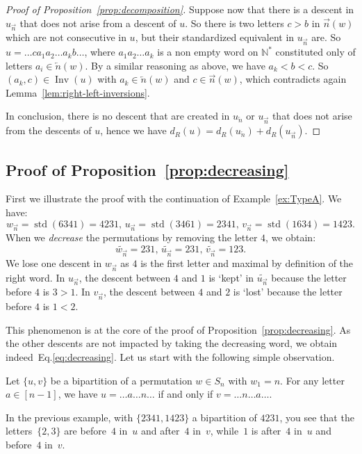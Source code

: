 \documentclass[ALCO,Unicode]{cedram}
\theoremstyle{definition}
\DeclareMathOperator{\std}{std}
\DeclareMathOperator{\invs}{Inv}
\newcommand{\dec}[1]{\widetilde{#1}}
\newcommand{\R}{{\overrightarrow{n}}}
\newcommand{\LL}{{\overleftarrow{n}}}
\newcommand{\dd}{d_R}
\begin{document}
\begin{proof}[Proof of Proposition~\ref{prop:decomposition}]
Suppose now that there is a descent in $u_\R$ that does not arise from a descent of $u$. So there is two letters $c > b$ in $\R(w)$ which are not consecutive in $u$, but their standardized equivalent in $u_\R$ are. So $u=\dots c a_1a_2\dots a_k b\dots$, where $a_1a_2\dots a_k$ is a non empty word on $\mathbb N^*$ constituted only of letters  $a_i\in\LL(w)$. By a similar reasoning as above, we have $a_k < b<c$. So $(a_k,c)\in\invs(u)$ with $a_k\in\LL(w)$ and $c\in\R(w)$, which contradicts again Lemma~\ref{lem:right-left-inversions}. 

In conclusion, there is no descent that are created in $u_\LL$ or $u_\R$ that does not arise from the descents of $u$, hence we have $\dd(u) = \dd(u_\LL) + \dd(u_\R).$
\end{proof}


\subsection{Proof of Proposition~\ref{prop:decreasing}} First we illustrate the proof with the continuation of Example~\ref{ex:TypeA}. We have:
$$
w_\R = \std(6341) = 4231, \, u_\R = \std(3461) = 2341, \, v_\R = \std(1634) = 1423.
$$
When we \emph{decrease} the permutations by removing the letter $4$, we obtain:
$$
\dec{w_\R} = 231, \,
\dec{u_\R} = 231, \,
\dec{v_\R} = 123.
$$
We lose one descent in $w_\R$ as $4$ is the first letter and maximal by definition of the right word. In $u_\R$, the descent between $4$ and $1$ is `kept' in $\dec{u_\R}$ because the letter before $4$ is $3 > 1$. In $v_\R$, the descent between $4$ and $2$ is `lost' because the letter before $4$ is $1 < 2$. 


This phenomenon is at the core of the proof of Proposition~\ref{prop:decreasing}. As the other descents are not impacted by taking the decreasing word, we obtain indeed~Eq.\eqref{eq:decreasing}. Let us start with the following simple observation.

\begin{lemm}
\label{lem:right-word-letters}
Let $\lbrace u, v \rbrace$ be a bipartition of a permutation $w \in S_n$ with $w_1 = n$. For any letter $a\in[n-1]$, we have $u=\dots a \dots n\dots$ if and only if $v=\dots n\dots a\dots$.
\end{lemm}

In the previous example, with $\lbrace 2341, 1423 \rbrace$ a bipartition of $4231$, you see that the letters~$\lbrace 2, 3 \rbrace$ are before~$4$ in~$u$ and after~$4$ in~$v$, while~$1$ is after~$4$ in~$u$ and before~$4$ in~$v$. 
\end{document}
